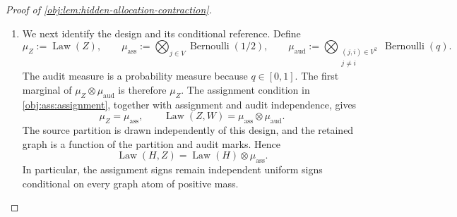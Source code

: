 \documentclass[11pt]{article}
\begin{document}
\begin{proof}[Proof of \cref{obj:lem:hidden-allocation-contraction}]
\begin{enumerate}
The falling-factorial formula for binomial coefficients gives
\[
\binom B{\nu_{\mathrm{rev}}}
\le\frac{B^{\nu_{\mathrm{rev}}}}{\nu_{\mathrm{rev}}!},
\qquad
\binom{B-\nu_{\mathrm{rev}}}{\nu_{\mathrm{hid}}}
\le\frac{B^{\nu_{\mathrm{hid}}}}{\nu_{\mathrm{hid}}!}.
\]
Using \(B>0\) and the definition of \(\rho\), we obtain
\[
\begin{aligned}
&\binom B{\nu_{\mathrm{rev}}}
\binom{B-\nu_{\mathrm{rev}}}{\nu_{\mathrm{hid}}}
\rho_{\nu_{\mathrm{rev}},\nu_{\mathrm{hid}}}^{\nu_{\mathrm{hid}}}
\\
&\qquad\le
\frac{B^{\nu_{\mathrm{rev}}}}{\nu_{\mathrm{rev}}!}
4^{\nu_{\mathrm{hid}}}
\frac{(\nu_{\mathrm{rev}}+\nu_{\mathrm{hid}})^{\nu_{\mathrm{hid}}}}
{\nu_{\mathrm{hid}}!}
\\
&\qquad\le
\frac{B^{\nu_{\mathrm{rev}}}}{\nu_{\mathrm{rev}}!}
4^{\nu_{\mathrm{hid}}}
\exp(\nu_{\mathrm{rev}}+\nu_{\mathrm{hid}})
=
\frac{(eB)^{\nu_{\mathrm{rev}}}}{\nu_{\mathrm{rev}}!}
(4e)^{\nu_{\mathrm{hid}}}.
\end{aligned}
\]
The second inequality bounds one nonnegative term of the exponential series by its sum. It includes \(\nu_{\mathrm{hid}}=0\), with the stated power convention. Thus
\[
\begin{aligned}
\mathfrak S_{\mathrm{nc}}+1
&\le
\left(
\sum_{\nu_{\mathrm{rev}}=0}^B
\frac{(eBp\eta_1)^{\nu_{\mathrm{rev}}}}{\nu_{\mathrm{rev}}!}
\right)
\left(
\sum_{\nu_{\mathrm{hid}}=0}^B
(4e\eta)^{\nu_{\mathrm{hid}}}
\right)
\\
&\le
\exp(eBp\eta_1)\sum_{\nu_{\mathrm{hid}}=0}^{\infty}
(4e\eta)^{\nu_{\mathrm{hid}}}
=
\frac{\exp(eBp\eta_1)}{1-4e\eta}.
\end{aligned}
\]
Here \(0\le4e\eta<1\) justifies the geometric series. Therefore
\[
\mathfrak S_{\mathrm{nc}}
\le
\frac{\exp(eBp\eta_1)}{1-4e\eta}-1.
\]

\item We next identify the design and its conditional reference. Define
\[
\mu_Z:=\operatorname{Law}(Z),
\qquad
\mu_{\mathrm{ass}}
:=
\bigotimes_{j\in V}\operatorname{Bernoulli}(1/2),
\qquad
\mu_{\mathrm{aud}}
:=
\bigotimes_{\substack{(j,i)\in V^2\\j\ne i}}
\operatorname{Bernoulli}(q).
\]
The audit measure is a probability measure because \(q\in[0,1]\).
The first marginal of \(\mu_Z\otimes\mu_{\mathrm{aud}}\) is therefore
\(\mu_Z\). The assignment condition in
\cref{obj:ass:assignment}, together with assignment and audit independence, gives
\[
\mu_Z=\mu_{\mathrm{ass}},
\qquad
\operatorname{Law}(Z,W)
=
\mu_{\mathrm{ass}}\otimes\mu_{\mathrm{aud}}.
\]
The source partition is drawn independently of this design, and the retained graph is a function of the partition and audit marks. Hence
\[
\operatorname{Law}(H,Z)
=
\operatorname{Law}(H)\otimes\mu_{\mathrm{ass}}.
\]
In particular, the assignment signs remain independent uniform signs conditional on every graph atom of positive mass.


\end{enumerate}
\end{proof}
\end{document}

